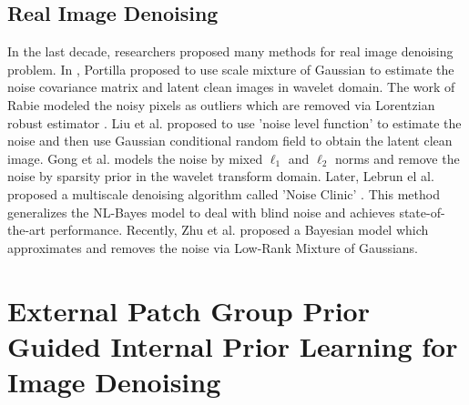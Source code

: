 \documentclass[10pt,twocolumn,letterpaper]{article}
\begin{document}
\subsection{Real Image Denoising}

In the last decade, researchers proposed many methods \cite{fullyblind,rabie2005robust,Liu2008,almapg,noiseclinic,ncwebsite,Zhu_2016_CVPR,crosschannel2016} for real image denoising problem. In \cite{fullyblind}, Portilla proposed to use scale mixture of Gaussian to estimate the noise covariance matrix and latent clean images in wavelet domain. The work of Rabie \cite{rabie2005robust} modeled the noisy pixels as outliers which are removed via Lorentzian robust estimator \cite{huber2011robust}. Liu et al. \cite{Liu2008} proposed to use 'noise level function' to estimate the noise and then use Gaussian conditional random field to obtain the latent clean image. Gong et al. \cite{almapg} models the noise by mixed $\ell_{1}$ and $\ell_{2}$ norms and remove the noise by sparsity prior in the wavelet transform domain. Later, Lebrun el al. proposed a multiscale denoising algorithm called 'Noise Clinic' \cite{noiseclinic,ncwebsite}. This method generalizes the NL-Bayes model \cite{nlbayes} to deal with blind noise and achieves state-of-the-art performance. Recently, Zhu et al. proposed a Bayesian model \cite{Zhu_2016_CVPR} which approximates and removes the noise via Low-Rank Mixture of Gaussians.

\section{External Patch Group Prior Guided Internal Prior Learning for Image Denoising}
\end{document}
